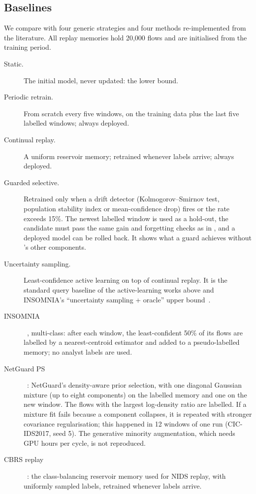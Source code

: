\subsection{Baselines}
\label{sec:baselines}
We compare with four generic strategies and four methods re-implemented from the literature. All replay memories
hold 20{,}000 flows and are initialised from the training period.
\begin{description}
  \item[Static.] The initial model, never updated: the lower bound.
  \item[Periodic retrain.] From scratch every five windows, on the training data plus the last five labelled
        windows; always deployed.
  \item[Continual replay.] A uniform reservoir memory; retrained whenever labels arrive; always deployed.
  \item[Guarded selective.] Retrained only when a drift detector (Kolmogorov--Smirnov test, population stability
        index or mean-confidence drop) fires or the \unk{} rate exceeds 15\%. The newest labelled window is used as
        a hold-out, the candidate must pass the same gain and forgetting checks as in \nova{}, and a deployed model
        can be rolled back. It shows what a guard achieves without \nova{}'s other components.
  \item[Uncertainty sampling.] Least-confidence active learning on top of continual replay. It is the standard
        query baseline of the active-learning works above and INSOMNIA's ``uncertainty sampling + oracle'' upper
        bound~\cite{andresini2021insomnia}.
  \item[INSOMNIA]~\cite{andresini2021insomnia}, multi-class: after each window, the least-confident 50\% of its
        flows are labelled by a nearest-centroid estimator and added to a pseudo-labelled memory; no analyst
        labels are used.
  \item[NetGuard PS]~\cite{gupta2025netguard}: NetGuard's density-aware prior selection, with one diagonal
        Gaussian mixture (up to eight components) on the labelled memory and one on the new window. The flows with
        the largest log-density ratio are labelled. If a mixture fit fails because a component collapses, it is
        repeated with stronger covariance regularisation; this happened in 12 windows of one run (CIC-IDS2017,
        seed 5). The generative minority augmentation, which needs GPU hours per cycle, is not reproduced.
  \item[CBRS replay]~\cite{chrysakis2020online,amalapuram2023augmented}: the class-balancing reservoir memory used
        for NIDS replay, with uniformly sampled labels, retrained whenever labels arrive.
\end{description}

